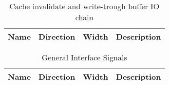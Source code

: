 \begin{table}[H]
  \centering
  \begin{tabularx}{\textwidth}{|l|l|r|X|}

    \hline
    \rowcolor{iob-green}
    {\bf Name} & {\bf Direction} & {\bf Width} & {\bf Description}  \\ \hline \hline

    

  \end{tabularx}
  \caption{Cache invalidate and write-trough buffer IO chain}
  \label{ie_io_if_tab:is}
\end{table}

\begin{table}[H]
  \centering
  \begin{tabularx}{\textwidth}{|l|l|r|X|}

    \hline
    \rowcolor{iob-green}
    {\bf Name} & {\bf Direction} & {\bf Width} & {\bf Description}  \\ \hline \hline

    

  \end{tabularx}
  \caption{General Interface Signals}
  \label{ge_i_if_tab:is}
\end{table}
\clearpage